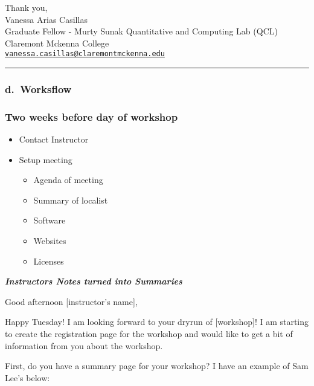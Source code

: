 \documentclass[
]{book}
\providecommand{\tightlist}{%
  \setlength{\itemsep}{0pt}\setlength{\parskip}{0pt}}
\begin{document}
Thank you,\\
Vanessa Arias Casillas\\
Graduate Fellow - Murty Sunak Quantitative and Computing Lab (QCL)\\
Claremont Mckenna College\\
\href{mailto:vanessa.casillas@claremontmckenna.edu}{\nolinkurl{vanessa.casillas@claremontmckenna.edu}}

\begin{center}\rule{0.5\linewidth}{0.5pt}\end{center}

\hypertarget{d.-worksflow}{%
\subsubsection{\texorpdfstring{d.~Worksflow }{d.~Worksflow }}\label{d.-worksflow}}

\hypertarget{two-weeks-before-day-of-workshop}{%
\subsubsection{\texorpdfstring{Two weeks before day of workshop }{Two weeks before day of workshop }}\label{two-weeks-before-day-of-workshop}}

\begin{itemize}
\tightlist
\item
  Contact Instructor\\
\item
  Setup meeting

  \begin{itemize}
  \tightlist
  \item
    Agenda of meeting
  \item
    Summary of localist
  \item
    Software
  \item
    Websites
  \item
    Licenses
  \end{itemize}
\end{itemize}

\textbf{\emph{Instructors Notes turned into Summaries}}

Good afternoon {[}instructor's name{]},

Happy Tuesday! I am looking forward to your dryrun of {[}workshop{]}! I am starting to create the registration page for the workshop and would like to get a bit of information from you about the workshop.

First, do you have a summary page for your workshop? I have an example of Sam Lee's below:
\end{document}
